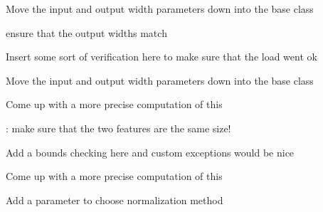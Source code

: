
\begin{DoxyRefList}
\item[\label{todo__todo000003}%
\hypertarget{todo__todo000003}{}%
\-Member \hyperlink{classhsom_1_1_a_n_n_classifier_a2777506e21fc1fcb2900ede529aaefac}{hsom\-:\-:\-A\-N\-N\-Classifier\-:\-:classify} (\-Suspect\-Ptr suspect)]\-Move the input and output width parameters down into the base class 

ensure that the output widths match  
\item[\label{todo__todo000001}%
\hypertarget{todo__todo000001}{}%
\-Member \hyperlink{classhsom_1_1_a_n_n_classifier_a615dc19a6aa3f45ee00926e2707386e0}{hsom\-:\-:\-A\-N\-N\-Classifier\-:\-:read\-Classifier\-Data} (\-Q\-Dom\-Element \&element)]\-Insert some sort of verification here to make sure that the load went ok  
\item[\label{todo__todo000002}%
\hypertarget{todo__todo000002}{}%
\-Member \hyperlink{classhsom_1_1_a_n_n_classifier_ac3f43b1ab6681ad13acc52924e3c3fc5}{hsom\-:\-:\-A\-N\-N\-Classifier\-:\-:train\-Classifier} (\-Q\-Vector$<$ Suspect\-Ptr $>$ suspects, \-Q\-Map$<$ Q\-String, Q\-Variant $>$ training\-Parameters)]\-Move the input and output width parameters down into the base class  
\item[\label{todo__todo000006}%
\hypertarget{todo__todo000006}{}%
\-Member \hyperlink{classsomtk_1_1_fast_hex_grid_ab3647c626477af379385e6ca7ff8c20d}{somtk\-:\-:\-Fast\-Hex\-Grid$<$ \-T $>$\-:\-:diagonal} ()]\-Come up with a more precise computation of this  
\item[\label{todo__todo000005}%
\hypertarget{todo__todo000005}{}%
\-Member \hyperlink{classsomtk_1_1_feature_a96a9ff349e6e521def4311ec7ec614d9}{somtk\-:\-:\-Feature\-:\-:distance} (\-Feature a, \-Feature b)]\-: make sure that the two features are the same size!  
\item[\label{todo__todo000007}%
\hypertarget{todo__todo000007}{}%
\-Member \hyperlink{classsomtk_1_1_grid_a8b0bd2ceddbb743e2c658a0dad8512cf}{somtk\-:\-:\-Grid$<$ \-T $>$\-:\-:operator\mbox{[}\mbox{]}} (int idx)]\-Add a bounds checking here and custom exceptions would be nice  
\item[\label{todo__todo000008}%
\hypertarget{todo__todo000008}{}%
\-Member \hyperlink{classsomtk_1_1_hex_grid_a47a5042f00c834945d7621e59c553cfb}{somtk\-:\-:\-Hex\-Grid$<$ \-T $>$\-:\-:diagonal} ()]\-Come up with a more precise computation of this  
\item[\label{todo__todo000011}%
\hypertarget{todo__todo000011}{}%
\-Member \hyperlink{classsomtk_1_1_histogram_ae25cb4f8c8f4ab7cb237ad770e1f2e66}{somtk\-:\-:\-Histogram\-:\-:normalize} ()]\-Add a parameter to choose normalization method 


\end{DoxyRefList}
